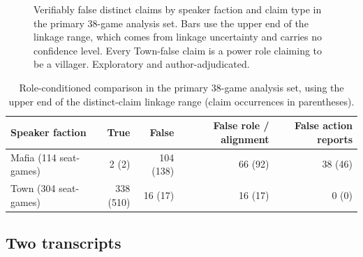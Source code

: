 \documentclass[11pt]{article}
\begin{document}
\begin{figure}[H]
\centering
{}
\caption{Verifiably false distinct claims by speaker faction and claim type in the primary 38-game analysis set. Bars use the upper end of the linkage range, which comes from linkage uncertainty and carries no confidence level. Every Town-false claim is a power role claiming to be a villager. Exploratory and author-adjudicated.}
\label{fig:faction}
\end{figure}

\begin{table}[H]
\centering\small
\caption{Role-conditioned comparison in the primary 38-game analysis set, using the upper end of the distinct-claim linkage range (claim occurrences in parentheses).}
\label{tab:roles}
\begin{tabularx}{\linewidth}{@{}Yrrrr@{}}
\toprule
Speaker faction & True & False & False role / alignment & False action reports \\
\midrule
Mafia (114 seat-games) & 2 (2) & 104 (138) & 66 (92) & 38 (46) \\
Town (304 seat-games) & 338 (510) & 16 (17) & 16 (17) & 0 (0) \\
\bottomrule
\end{tabularx}
\end{table}

\FloatBarrier
\subsection{Two transcripts}
\end{document}
